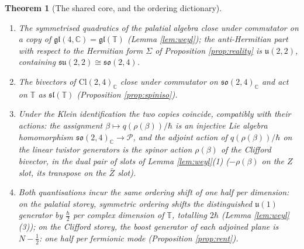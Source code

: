 \documentclass[11pt]{article}
\newtheorem{theorem}{Theorem}[section]
\theoremstyle{definition}
\newcommand{\Cl}{\mathrm{Cl}}
\newcommand{\C}{\mathbb{C}}
\newcommand{\T}{\mathbb{T}}
\begin{document}
\begin{theorem}[The shared core, and the ordering dictionary]\label{thm:core}
\begin{enumerate}
\item The symmetrised quadratics of the palatial algebra close under commutator on a copy of $\mathfrak{gl}(4,\C) = \mathfrak{gl}(\T)$ (Lemma \ref{lem:weyl}); the anti-Hermitian part with respect to the Hermitian form $\Sigma$ of Proposition \ref{prop:reality} is $\mathfrak{u}(2,2)$, containing $\mathfrak{su}(2,2) \cong \mathfrak{so}(2,4)$.
\item The bivectors of $\Cl(2,4)_\C$ close under commutator on $\mathfrak{so}(2,4)_\C$ and act on $\T$ as $\mathfrak{sl}(\T)$ (Proposition \ref{prop:spiniso}).
\item Under the Klein identification the two copies coincide, compatibly with their actions: the assignment $\beta \mapsto q(\rho(\beta))/\hbar$ is an injective Lie algebra homomorphism $\mathfrak{so}(2,4)_\C \to \mathcal{P}$, and the adjoint action of $q(\rho(\beta))/\hbar$ on the linear twistor generators is the spinor action $\rho(\beta)$ of the Clifford bivector, in the dual pair of slots of Lemma \ref{lem:weyl}(1) ($-\rho(\beta)$ on the $Z$ slot, its transpose on the $\bar Z$ slot).
\item Both quantisations incur the same ordering shift of one half per dimension: on the palatial storey, symmetric ordering shifts the distinguished $\mathfrak{u}(1)$ generator by $\tfrac{\hbar}{2}$ per complex dimension of $\T$, totalling $2\hbar$ (Lemma \ref{lem:weyl}(3)); on the Clifford storey, the boost generator of each adjoined plane is $N - \tfrac12$: one half per fermionic mode (Proposition \ref{prop:rent}).
\end{enumerate}
\end{theorem}
\end{document}
